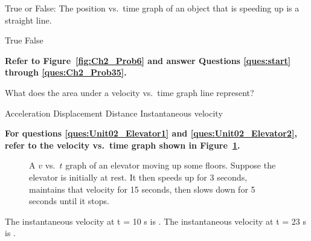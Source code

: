 \documentclass[answers]{exam}
\begin{document}
\begin{questions}
\begin{questions}
\question
True or False: The position vs.~time graph of an object that is speeding up is a straight line.

\begin{choices}
\choice True
\CorrectChoice False
\end{choices}



\begin{EnvUplevel}
\textbf{Refer to Figure~\ref{fig:Ch2_Prob6} and answer Questions \ref{ques:start} through \ref{ques:Ch2_Prob35}.}
\end{EnvUplevel}


\question
What does the area under a velocity vs.~time graph line represent?

\begin{choices}
\choice Acceleration
\CorrectChoice Displacement
\choice Distance
\choice Instantaneous velocity
\end{choices}

\begin{EnvUplevel}
\textbf{For questions \ref{ques:Unit02_Elevator1} and \ref{ques:Unit02_Elevator2}, refer to the velocity vs.~time graph shown in Figure~\ref{fig:Unit02_Fig2.20}.}
\end{EnvUplevel}

\begin{figure}[h!]
    \centering
    \caption{A $v$ vs.~$t$ graph of an elevator moving up some floors. Suppose the elevator is initially at rest. It then speeds up for 3 seconds, maintains that velocity for 15 seconds, then slows down for 5 seconds until it stops.}
    \label{fig:Unit02_Fig2.20}
\end{figure}

\question \label{ques:Unit02_Elevator1}

The instantaneous velocity at t = 10 s is \underline{\hspace{2cm}}. The instantaneous velocity at t = 23 s is \underline{\hspace{2cm}}.


\end{questions}
\end{questions}
\end{document}
